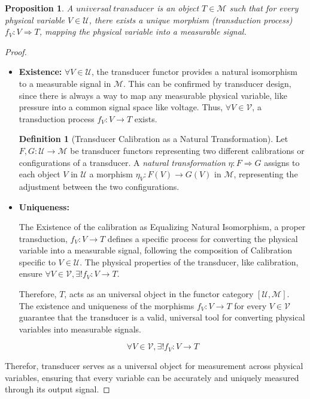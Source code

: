 \documentclass{article}
\newtheorem{proposition}{Proposition}[section]
\theoremstyle{definition}
\newtheorem{definition}{Definition}[section]
\theoremstyle{remark}
\begin{document}
	\begin{proposition}
		A $universal \ transducer$ is an object $T \in \mathcal{M}$ such that for every physical variable $V \in \mathcal{U}$, there exists a unique morphism (transduction process) $f_{V}: V \Rightarrow T$, mapping the physical variable into a measurable signal.
	\end{proposition}
	
	
	\begin{proof}
		\hfill \break
		\begin{itemize}
			
			\item \textbf{Existence:} 
			$\forall V \in \mathcal{U}$, the transducer functor provides a natural isomorphism to  a measurable signal in $\mathcal{M}$. This can be confirmed by transducer design, since there is always a way to map any measurable physical variable, like pressure into a common signal space like voltage. Thus, $\forall V \in \mathcal{V}$, a transduction process $f_V: V \to T$ exists.
			
			
			\begin{definition}[Transducer Calibration as a Natural Transformation]
				Let $F, G: \mathcal{U} \rightarrow \mathcal{M}$ be transducer functors representing two different calibrations or configurations of a transducer. A \emph{natural transformation} $\eta: F \Rightarrow G$ assigns to each object $V$ in $\mathcal{U}$ a morphism $\eta_V: F(V) \rightarrow G(V)$ in $\mathcal{M}$, representing the adjustment between the two configurations.
			\end{definition}
			
			\item \textbf{Uniqueness:} 
			
			The Existence of the calibration as Equalizing Natural Isomorphism, a proper transduction, $f_V: V \to T$ defines a specific process for converting the physical variable into a measurable signal, following the composition of Calibration specific to $V \in \mathcal{U}$. The physical properties of the transducer, like calibration, ensure $\forall V \in \mathcal{V}, \exists ! f_V: V \to T$.
			
			Therefore, $T$,  acts as an universal object in the functor category $[\mathcal{U}, \mathcal{M}]$. The existence and uniqueness of the morphisms $f_V: V \to T$ for every \( V \in \mathcal{V} \) guarantee that the transducer is a valid, universal tool for converting physical variables into measurable signals.
			
			$$\forall V \in \mathcal{V}, \exists ! f_V: V \to T$$
		\end{itemize}
		
		Therefor, transducer serves as a universal object for measurement across physical variables, ensuring that every variable can be accurately and uniquely measured through its output signal.
		
		
		
	\end{proof}
	
\end{document}
